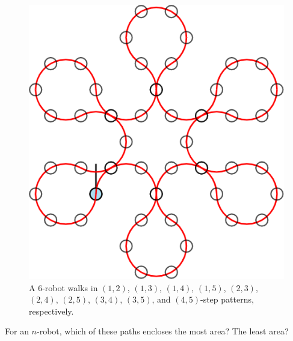 \documentclass{article}
\begin{document}
\begin{figure}[ht!]
  \includegraphics[scale=0.12]{assets/robot_walks/079_problem_6-robot_4_5.png}
  \caption{
    A $6$-robot walks in $(1,2)$, $(1,3)$, $(1,4)$, $(1,5)$, $(2,3)$,
    $(2,4)$, $(2,5)$, $(3,4)$, $(3,5)$, and $(4,5)$-step patterns, respectively.
  }
\end{figure}
\begin{question}
  For an $n$-robot, which of these paths encloses the most area? The least area?
\end{question}
\end{document}
